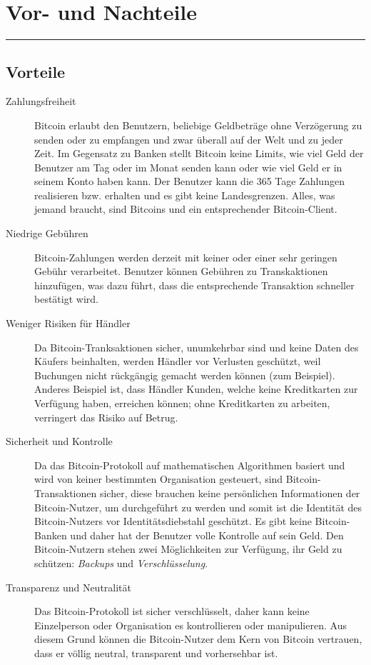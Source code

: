 \section*{Vor- und Nachteile}
\vspace{-10mm}
\noindent\rule{0.8\textwidth}{0.4pt}
\subsection*{Vorteile}

\begin{description}
  \item[Zahlungsfreiheit] Bitcoin erlaubt den Benutzern, beliebige Geldbeträge
  ohne Verzögerung zu senden oder zu empfangen und zwar überall auf der Welt und
  zu jeder Zeit. Im Gegensatz zu Banken stellt Bitcoin keine Limits, wie viel Geld
  der Benutzer am Tag oder im Monat senden kann oder wie viel Geld er in seinem
  Konto haben kann. Der Benutzer kann die 365 Tage Zahlungen realisieren bzw.
  erhalten und es gibt keine Landesgrenzen. Alles, was jemand braucht, sind Bitcoins
  und ein entsprechender Bitcoin-Client.
  \item[Niedrige Gebühren] Bitcoin-Zahlungen werden derzeit mit keiner oder einer
  sehr geringen Gebühr verarbeitet. Benutzer können Gebühren zu Transkaktionen
  hinzufügen, was dazu führt, dass die entsprechende Transaktion schneller bestätigt wird.
  \item[Weniger Risiken für Händler] Da Bitcoin-Tranksaktionen sicher, unumkehrbar sind und
  keine Daten des Käufers beinhalten, werden Händler vor Verlusten geschützt, weil
  Buchungen nicht rückgängig gemacht werden können (zum Beispiel). Anderes Beispiel
  ist, dass Händler Kunden, welche keine Kreditkarten zur Verfügung haben, erreichen
  können; ohne Kreditkarten zu arbeiten, verringert das Risiko auf Betrug.
  \item[Sicherheit und Kontrolle] Da das Bitcoin-Protokoll auf mathematischen Algorithmen
  basiert und wird von keiner bestimmten Organisation gesteuert, sind Bitcoin-Transaktionen sicher,
  diese brauchen keine persönlichen Informationen der Bitcoin-Nutzer, um durchgeführt zu werden
  und somit ist die Identität des Bitcoin-Nutzers vor Identitätsdiebstahl geschützt. Es gibt keine Bitcoin-Banken und daher
  hat der Benutzer volle Kontrolle auf sein Geld. Den Bitcoin-Nutzern stehen zwei Möglichkeiten
  zur Verfügung, ihr Geld zu schützen: \emph{Backups} und \emph{Verschlüsselung}.
  \item[Transparenz und Neutralität] Das Bitcoin-Protokoll ist sicher verschlüsselt, daher kann
  keine Einzelperson oder Organisation es kontrollieren oder manipulieren. Aus diesem Grund können die Bitcoin-Nutzer
  dem Kern von Bitcoin vertrauen, dass er völlig neutral, transparent und vorhersehbar ist.

\end{description}
